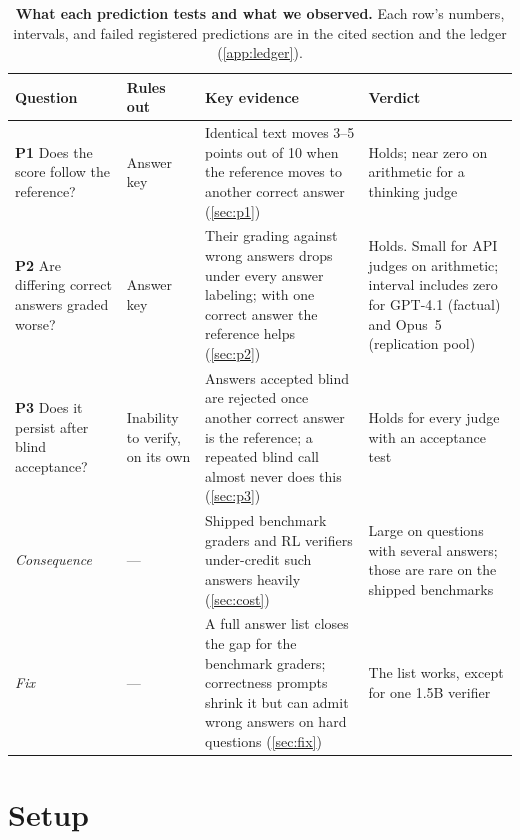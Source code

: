 \documentclass{article}
\begin{document}
\begin{table}[t]
\centering
\small
\caption{\textbf{What each prediction tests and what we observed.} Each row's numbers, intervals, and failed registered predictions are in the cited section and the ledger (\cref{app:ledger}).}
\label{tab:summary}
\setlength{\tabcolsep}{4pt}
\renewcommand{\arraystretch}{1.0}
\begin{tabular}{L{2.9cm}L{2.0cm}L{5.0cm}L{2.7cm}}
\toprule
Question & Rules out & Key evidence & Verdict \\
\midrule
\textbf{P1} Does the score follow the reference? & Answer key & Identical text moves 3--5 points out of 10 when the reference moves to another correct answer (\cref{sec:p1}) & Holds; near zero on arithmetic for a thinking judge \\
\textbf{P2} Are differing correct answers graded worse? & Answer key & Their grading against wrong answers drops under every answer labeling; with one correct answer the reference helps (\cref{sec:p2}) & Holds. Small for API judges on arithmetic; interval includes zero for GPT-4.1 (factual) and Opus~5 (replication pool) \\
\textbf{P3} Does it persist after blind acceptance? & Inability to verify, on its own & Answers accepted blind are rejected once another correct answer is the reference; a repeated blind call almost never does this (\cref{sec:p3}) & Holds for every judge with an acceptance test \\
\emph{Consequence} & --- & Shipped benchmark graders and RL verifiers under-credit such answers heavily (\cref{sec:cost}) & Large on questions with several answers; those are rare on the shipped benchmarks \\
\emph{Fix} & --- & A full answer list closes the gap for the benchmark graders; correctness prompts shrink it but can admit wrong answers on hard questions (\cref{sec:fix}) & The list works, except for one 1.5B verifier \\
\bottomrule
\end{tabular}
\end{table}

\section{Setup}
\label{sec:setup}
\end{document}
